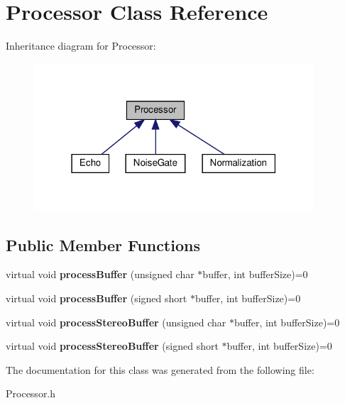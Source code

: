 \hypertarget{classProcessor}{}\section{Processor Class Reference}
\label{classProcessor}


Inheritance diagram for Processor\+:
\nopagebreak
\begin{figure}[H]
\begin{center}
\leavevmode
\includegraphics[width=295pt]{dd/d93/classProcessor__inherit__graph}
\end{center}
\end{figure}
\subsection*{Public Member Functions}
\begin{DoxyCompactItemize}
\item 
\mbox{\label{classProcessor_a401e57b59e43de9c4a51ca0f566d2948}} 
virtual void {\bfseries process\+Buffer} (unsigned char $\ast$buffer, int buffer\+Size)=0
\item 
\mbox{\label{classProcessor_a43c891cf4889858380375c455e02df45}} 
virtual void {\bfseries process\+Buffer} (signed short $\ast$buffer, int buffer\+Size)=0
\item 
\mbox{\label{classProcessor_a06ecb7c9959d197a363f5ff4c33c6eb3}} 
virtual void {\bfseries process\+Stereo\+Buffer} (unsigned char $\ast$buffer, int buffer\+Size)=0
\item 
\mbox{\label{classProcessor_adf8eed92a112cee827466f0ca93cce93}} 
virtual void {\bfseries process\+Stereo\+Buffer} (signed short $\ast$buffer, int buffer\+Size)=0
\end{DoxyCompactItemize}


The documentation for this class was generated from the following file\+:\begin{DoxyCompactItemize}
\item 
Processor.\+h\end{DoxyCompactItemize}
